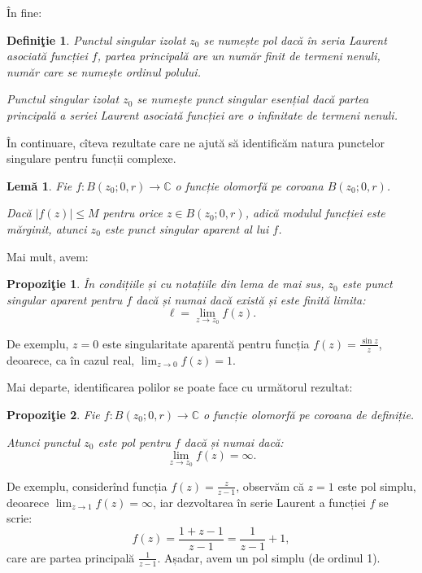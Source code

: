 \documentclass[12pt,a4paper]{article}
\newcommand\CC{\mathbb{C}}
\theoremstyle{dotless}
\newtheorem{proposition}{Propozi\c{t}ie}
\newtheorem{lemma}{Lem\u{a}}
\theoremstyle{dotlessdr}
\newtheorem{definition}{Defini\c{t}ie}
\begin{document}
În fine:

\begin{definition}\label{def:pol}
  Punctul singular izolat $ z_0 $ se numește \emph{pol} dacă în seria Laurent asociată
  funcției $ f $, partea principală are un număr finit de termeni nenuli, număr care
  se numește \emph{ordinul polului}.

  Punctul singular izolat $ z_0 $ se numește \emph{punct singular esențial} dacă
  partea principală a seriei Laurent asociată funcției are o infinitate de termeni
  nenuli.
\end{definition}

În continuare, cîteva rezultate care ne ajută să identificăm natura punctelor
singulare pentru funcții complexe.

\begin{lemma}\label{le:sing-ap}
  Fie $ f : B(z_0; 0, r) \to \CC $ o funcție olomorfă pe coroana $ B(z_0; 0, r) $.

  Dacă $ |f(z)| \leq M $ pentru orice $ z \in B(z_0; 0, r) $, adică modulul funcției este
  mărginit, atunci $ z_0 $ este punct singular aparent al lui $ f $.
\end{lemma}

Mai mult, avem:

\begin{proposition}\label{pr:sing-ap}
  În condițiile și cu notațiile din lema de mai sus, $ z_0 $ este punct singular
  aparent pentru $ f $ dacă și numai dacă există și este finită limita:
  \[
    \ell = \lim_{z \to z_0} f(z).
  \]
\end{proposition}

De exemplu, $ z = 0 $ este singularitate aparentă pentru funcția $ f(z) = \frac{\sin z}{z} $,
deoarece, ca în cazul real, $ \lim_{z \to 0} f(z) = 1 $.

Mai departe, identificarea polilor se poate face cu următorul rezultat:

\begin{proposition}\label{pr:pol}
  Fie $ f : B(z_0; 0, r) \to \CC $ o funcție olomorfă pe coroana de definiție.

  Atunci punctul $ z_0 $ este pol pentru $ f $ dacă și numai dacă:
  \[
    \lim_{z \to z_0} f(z) = \infty.
  \]
\end{proposition}

De exemplu, considerînd funcția $ f(z) = \frac{z}{z - 1} $, observăm că $ z = 1 $
este pol simplu, deoarece $ \lim_{z \to 1} f(z) = \infty $, iar dezvoltarea în
serie Laurent a funcției $ f $ se scrie:
\[
  f(z) = \frac{1 + z - 1}{z - 1} = \frac{1}{z - 1} + 1,
\]
care are partea principală $ \frac{1}{z - 1} $. Așadar, avem un pol simplu (de ordinul 1).
\end{document}
